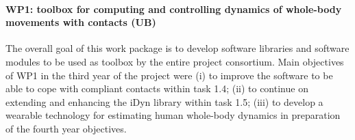 \paragraph{WP1: toolbox for computing and controlling dynamics of whole-body
  movements with contacts (UB)}

The overall goal of this work package is to develop software libraries and
software modules to be used as toolbox by the entire project consortium.  Main
objectives of WP1 in the third year of the project were (i) to improve the
software to be able to cope with compliant contacts within task 1.4; (ii)
to continue on extending and enhancing the iDyn library within task 1.5;
(iii) to develop a wearable technology for estimating human whole-body
dynamics in preparation of the fourth year objectives.

